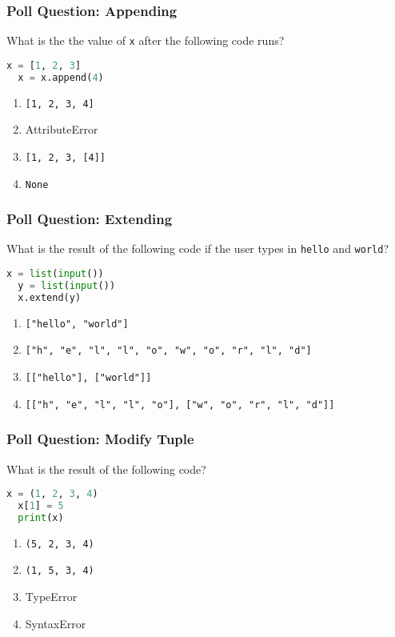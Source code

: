 \documentclass[xcolor=table]{beamer}
\begin{document}
%
%
\begin{frame}[fragile]
  \frametitle{Poll Question: Appending}
  What is the the value of \lstinline|x| after the following code runs?
  \begin{lstlisting}[language=Python, autogobble]
  x = [1, 2, 3]
  x = x.append(4)
  \end{lstlisting}
  \vfill
  \begin{enumerate}[A] 
    \item \lstinline|[1, 2, 3, 4]|
    \item AttributeError
    \item \lstinline|[1, 2, 3, [4]]|
    \item \lstinline|None|
  \end{enumerate}
\end{frame}

%
%
\begin{frame}[fragile]
  \frametitle{Poll Question: Extending}
  What is the result of the following code if the user types in
  \lstinline|hello| and \lstinline|world|?
  \begin{lstlisting}[language=Python, autogobble]
  x = list(input())
  y = list(input())
  x.extend(y)
  \end{lstlisting}
  \vfill
  \begin{enumerate}[A] 
    \item \lstinline|["hello", "world"]|
    \item \lstinline|["h", "e", "l", "l", "o", "w", "o", "r", "l", "d"]|
    \item \lstinline|[["hello"], ["world"]]|
    \item \lstinline|[["h", "e", "l", "l", "o"], ["w", "o", "r", "l", "d"]]|
  \end{enumerate}
\end{frame}

%
%
\begin{frame}[fragile]
  \frametitle{Poll Question: Modify Tuple}
  What is the result of the following code?
  \begin{lstlisting}[language=Python, autogobble]
  x = (1, 2, 3, 4)
  x[1] = 5
  print(x)
  \end{lstlisting}
  \vfill
  \begin{enumerate}[A] 
    \item \lstinline|(5, 2, 3, 4)|
    \item \lstinline|(1, 5, 3, 4)|
    \item TypeError
    \item SyntaxError
  \end{enumerate}
\end{frame}
\end{document}
